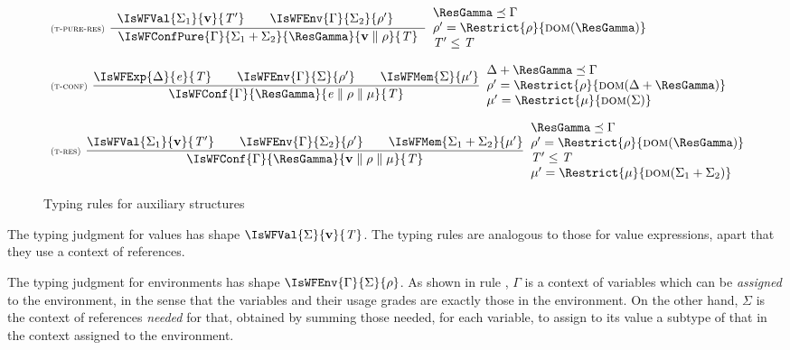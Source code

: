 \begin{figure}
\begin{math}
\begin{array}{l}
{}
\\[5ex]
\NamedRule{t-pure-res}
{
\begin{array}{l}
\IsWFVal{\Sigma_1}{\val}{\T'}\BigSpace
\IsWFEnv{\Gamma}{\Sigma_2}{\env'}\BigSpace
\end{array}
}
{
\IsWFConfPure{\Gamma}{\Sigma_1\ctxsum\Sigma_2}{\ResGamma}{\VConf{\val}{\env}}{\T}
}
{
\ResGamma\ctxord\Gamma\\
\env'=\Restrict{\env}{\dom{\ResGamma}}\\
\T'\subt\T
}
\\[5ex]
\NamedRule{t-conf}
{
\IsWFExp{\Delta}{\e}{\T}\BigSpace
\IsWFEnv{\Gamma}{\Sigma}{\env'}\BigSpace
\IsWFMem{\Sigma}{\mem'}
}
{
\IsWFConf{\Gamma}{\ResGamma}{\Conf{\e}{\env}{\mem}}{\T}
}
{
\Delta\ctxsum\ResGamma\ctxord\Gamma\\
\env'=\Restrict{\env}{\dom{\Delta\ctxsum\ResGamma}}\\
\mem'=\Restrict{\mem}{\dom{\Sigma}}
}

\\[5ex]

\NamedRule{t-res}
{
\IsWFVal{\Sigma_1}{\val}{\T'}\BigSpace
\IsWFEnv{\Gamma}{\Sigma_2}{\env'}\BigSpace
\IsWFMem{\Sigma_1\ctxsum\Sigma_2}{\mem'}
}
{
\IsWFConf{\Gamma}{\ResGamma}{\Conf{\val}{\env}{\mem}}{\T}
}
{
\ResGamma\ctxord\Gamma\\
\env'=\Restrict{\env}{\dom{\ResGamma}}\\
\T'\subt\T\\
\mem'=\Restrict{\mem}{\dom{\Sigma_1\ctxsum\Sigma_2}}
}

\end{array}
\end{math}

\caption{Typing rules for auxiliary structures}\label{fig:typing-aux}
\end{figure}
 The typing judgment for values has shape $\IsWFVal{\Sigma}{\val}{\T}$. The typing rules are analogous to those for value expressions, apart that they use a context of references. 
  
The typing judgment for environments has shape $\IsWFEnv{\Gamma}{\Sigma}{\env}$. As shown in rule \mbox{}, $\Gamma$ is a context of variables which can be \emph{assigned} to the environment, in the sense that the variables and their usage grades are exactly those in the environment. On the other hand, $\Sigma$ is the context of references \emph{needed} for that, obtained by summing those needed, for each variable, to assign to its value a subtype of that in the context assigned to the environment. 



